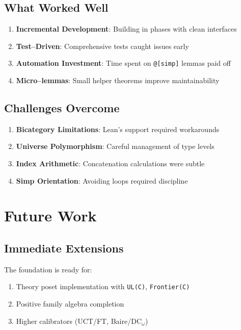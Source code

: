 \documentclass[11pt]{article}
\theoremstyle{definition}
\theoremstyle{remark}
\newcommand{\lean}[1]{\texttt{#1}}
\begin{document}
\subsection{What Worked Well}

\begin{enumerate}
\item \textbf{Incremental Development}: Building in phases with clean interfaces
\item \textbf{Test--Driven}: Comprehensive tests caught issues early
\item \textbf{Automation Investment}: Time spent on \texttt{@[simp]} lemmas paid off
\item \textbf{Micro--lemmas}: Small helper theorems improve maintainability
\end{enumerate}

\subsection{Challenges Overcome}

\begin{enumerate}
\item \textbf{Bicategory Limitations}: Lean's support required workarounds
\item \textbf{Universe Polymorphism}: Careful management of type levels
\item \textbf{Index Arithmetic}: Concatenation calculations were subtle
\item \textbf{Simp Orientation}: Avoiding loops required discipline
\end{enumerate}

\section{Future Work}

\subsection{Immediate Extensions}

The foundation is ready for:
\begin{enumerate}
\item Theory poset implementation with \lean{UL(C)}, \lean{Frontier(C)}
\item Positive family algebra completion
\item Higher calibrators (UCT/FT, Baire/DC$_\omega$)
\end{enumerate}
\end{document}
